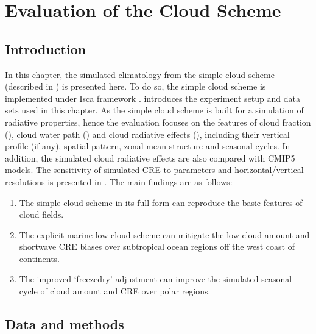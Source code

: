 \chapter{Evaluation of the Cloud Scheme}
\label{ch:eval_cld_scheme}

\section{Introduction}

In this chapter, the simulated climatology from the simple cloud scheme (described in ) is presented here. To do so, the simple cloud scheme is implemented under Isca framework \citep{Vallis2018}.  introduces the experiment setup and data sets used in this chapter. As the simple cloud scheme is built for a simulation of radiative properties, hence the evaluation focuses on the features of cloud fraction (), cloud water path () and cloud radiative effects (), including their vertical profile (if any), spatial pattern, zonal mean structure and seasonal cycles. In addition, the simulated cloud radiative effects are also compared with CMIP5 models. The sensitivity of simulated CRE to parameters and horizontal/vertical resolutions is presented in .
The main findings are as follows:
\begin{enumerate}
    \item The simple cloud scheme in its full form can reproduce the basic features of cloud fields.
    \item The explicit marine low cloud scheme can mitigate the low cloud amount and shortwave CRE biases over subtropical ocean regions off the west coast of continents.
    \item The improved `freezedry' adjustment can improve the simulated seasonal cycle of cloud amount and CRE over polar regions.
\end{enumerate}

\section{Data and methods}
\label{sec:exp_setup_and_dataset}

